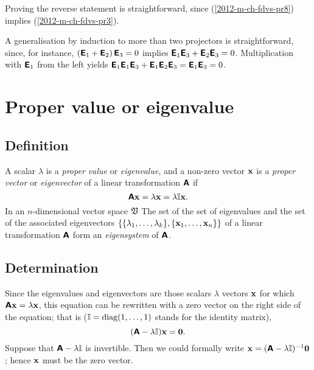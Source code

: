 {Proving the reverse statement is straightforward, since (\ref{2012-m-ch-fdvs-pr8}) implies  (\ref{2012-m-ch-fdvs-pr3}).

A generalisation by induction to more than two projectors is straightforward,
since, for instance,
$\left(\textsf{\textbf{E}}_1+\textsf{\textbf{E}}_2\right)\textsf{\textbf{E}}_3=0$
implies
$ \textsf{\textbf{E}}_1\textsf{\textbf{E}}_3+\textsf{\textbf{E}}_2\textsf{\textbf{E}}_3=0$.
Multiplication with $\textsf{\textbf{E}}_1$ from the left yields
$
\textsf{\textbf{E}}_1\textsf{\textbf{E}}_1\textsf{\textbf{E}}_3+\textsf{\textbf{E}}_1\textsf{\textbf{E}}_2\textsf{\textbf{E}}_3=
\textsf{\textbf{E}}_1 \textsf{\textbf{E}}_3=
0$.
 \eproof }


\section{Proper value or eigenvalue}

\subsection{Definition}

A scalar $\lambda$ is a {\em proper value} or {\em eigenvalue},
and a non-zero vector ${\bf x}$ is a {\em proper vector} or {\em eigenvector}
of a linear transformation $\textsf{\textbf{A}}$
if
\begin{equation}
\textsf{\textbf{A}}{\bf x}=   \lambda {\bf x} =   \lambda {\Bbb I} {\bf x}.
\end{equation}
In an $n$-dimensional
vector space $\frak V$
The set of the set of eigenvalues and the set of the associated eigenvectors
$\{\{\lambda_1,\ldots ,\lambda_k\},\{{\bf x}_1,\ldots ,{\bf x}_n\}\}$
of a linear transformation $\textsf{\textbf{A}}$ form an {\em eigensystem} of $\textsf{\textbf{A}}$.

\subsection{Determination}



Since the eigenvalues and eigenvectors are those scalars $\lambda$  vectors ${\bf x}$ for which $\textsf{\textbf{A}}{\bf x}=   \lambda {\bf x}$,
this equation can be rewritten with a zero vector on the right side of the equation; that is (${\Bbb I}=\textrm{diag}(1,\ldots ,1)$ stands for the identity matrix),
\begin{equation}
(\textsf{\textbf{A}} - \lambda {\Bbb I}){\bf x}= {\bf 0}.
\label{2011-m-eve}
\end{equation}
Suppose that $\textsf{\textbf{A}} - \lambda {\Bbb I}$ is invertible. Then we could formally write
${\bf x} = (\textsf{\textbf{A}} - \lambda {\Bbb I})^{-1}{\bf 0}$; hence ${\bf x}$ must be the zero vector.

